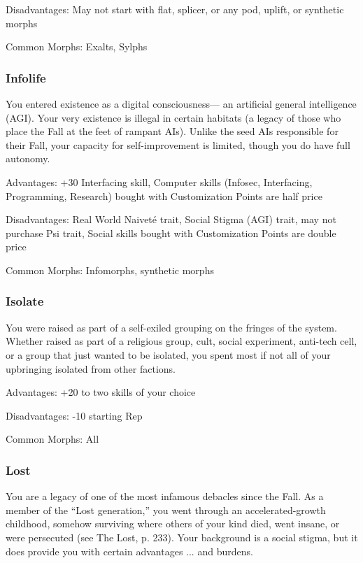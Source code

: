 Disadvantages: May not start with flat, splicer, or any pod, uplift, or synthetic morphs 

Common Morphs: Exalts, Sylphs 

\subsubsection{Infolife} \label{sec:infolife} 

You entered existence as a digital consciousness— an artificial general intelligence (AGI). Your very existence is illegal in certain habitats (a legacy of those who place the Fall at the feet of rampant AIs). Unlike the seed AIs responsible for their Fall, your capacity for self-improvement is limited, though you do have full autonomy. 

Advantages: +30 Interfacing skill, Computer skills (Infosec, Interfacing, Programming, Research) bought with Customization Points are half price 

Disadvantages: Real World Naiveté trait, Social Stigma (AGI) trait, may not purchase Psi trait, Social skills bought with Customization Points are double price 

Common Morphs: Infomorphs, synthetic morphs 

\subsubsection{Isolate} \label{sec:isolite} 

You were raised as part of a self-exiled grouping on the fringes of the system. Whether raised as part of a religious group, cult, social experiment, anti-tech cell, or a group that just wanted to be isolated, you spent most if not all of your upbringing isolated from other factions. 

Advantages: +20 to two skills of your choice 

Disadvantages: -10 starting Rep 

Common Morphs: All 

\subsubsection{Lost} \label{sec:lost} 

You are a legacy of one of the most infamous debacles since the Fall. As a member of the “Lost generation,” you went through an accelerated-growth childhood, somehow surviving where others of your kind died, went insane, or were persecuted (see The Lost, p. 233). Your background is a social stigma, but it does provide you with certain advantages ... and burdens. 

